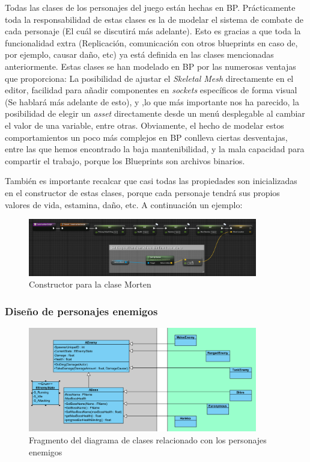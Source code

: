 Todas las clases de los personajes del juego están hechas en \ac{BP}. Prácticamente toda la responsabilidad de estas clases es la de modelar el sistema de combate de cada personaje (El cuál se discutirá más adelante). Esto es gracias a que toda la funcionalidad extra (Replicación, comunicación con otros blueprints en caso de, por ejemplo, causar daño, etc) ya está definida en las clases mencionadas anteriormente. Estas clases se han modelado en \ac{BP} por las numerosas ventajas que proporciona: La posibilidad de ajustar el \textit{Skeletal Mesh} directamente en el editor, facilidad para añadir componentes en \textit{sockets} específicos de forma visual (Se hablará más adelante de esto), y ,lo que más importante nos ha parecido, la posibilidad de elegir un \textit{asset} directamente desde un menú desplegable al cambiar el valor de una variable, entre otras. Obviamente, el hecho de modelar estos comportamientos un poco más complejos en \ac{BP} conlleva ciertas desventajas, entre las que hemos encontrado la baja mantenibilidad, y la mala capacidad para compartir el trabajo, porque los Blueprints son archivos binarios.


También es importante recalcar que casi todas las propiedades son inicializadas en el constructor de estas clases, porque cada personaje tendrá sus propios valores de vida, estamina, daño, etc. A continuación un ejemplo:

\begin{figure}[H]
  \centering
  \includegraphics[width=10cm]{./images/BP_Morten_Constructor.png}
  \caption{Constructor para la clase Morten}
  \label{MortenConstructor}
\end{figure}


\subsubsection{Diseño de personajes enemigos}

\begin{figure}[H]
  \centering
  \includegraphics[width=10cm]{./images/Classes_Enemigos.png}
  \caption{Fragmento del diagrama de clases relacionado con los personajes enemigos}
  \label{ClassesEnemies}
\end{figure}

